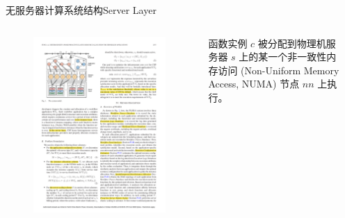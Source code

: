 \documentclass[aspectratio=169]{beamer}
\begin{document}
\begin{frame}{无服务器计算系统结构}{Server Layer}
  \begin{columns}
    \begin{figure}
      \centering
      \includegraphics[width=\textwidth]{img/serverless-system-architecture/system-model-server.pdf}
    \end{figure}
    函数实例 $c$ 被分配到物理机服务器 $s$ 上的某一个非一致性内存访问 (Non-Uniform Memory Access, NUMA) 节点 $nn$ 上执行。

    \rule{0.2mm}{0.825\textheight}

    \pause


\end{columns}
\end{frame}
\end{document}
